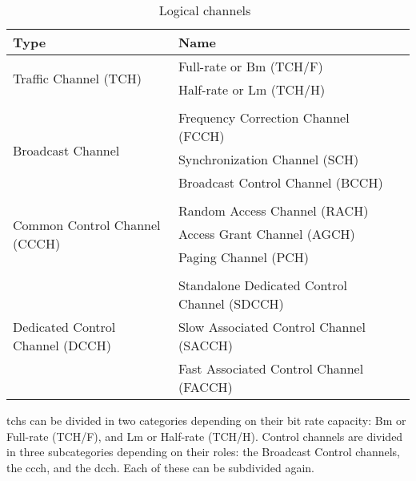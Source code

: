        \begin{table}[h]
          \centering
          \begin{tabular}{@{}lll@{}}
            \toprule
            Type          & Name                    \\
            \midrule

            \multirow{2}{*}{\parbox{0.30\textwidth}{\raggedright Traffic
            Channel (TCH)}} & Full-rate or Bm (TCH/F) \\
                          & Half-rate or Lm (TCH/H) \\

            \\

            \multirow{3}{*}{\parbox{0.30\textwidth}{\raggedright Broadcast
            Channel}} & Frequency Correction Channel (FCCH)\\
                          & Synchronization Channel (SCH)\\
                          & Broadcast Control Channel (BCCH)\\
            \\

            \multirow{3}{*}{\parbox{0.30\textwidth}{\raggedright Common
            Control Channel (CCCH)}} & Random Access Channel (RACH)\\
                          & Access Grant Channel (AGCH)\\
                          & Paging Channel (PCH)\\
            \\
             \multirow{3}{*}{\parbox{0.30\textwidth}{\raggedright
             Dedicated Control Channel (DCCH)}} & Standalone Dedicated Control Channel (SDCCH)\\
                          & Slow Associated Control Channel (SACCH)\\
                          & Fast Associated Control Channel (FACCH)\\
            \bottomrule
          \end{tabular}
          \caption{Logical channels~\cite{3gpp_ts_2015-3}}
          \label{tab:logical_channels}
        \end{table}

      \glspl{tch} can be divided in two categories depending on their
      bit rate capacity: Bm or Full-rate (TCH/F), and Lm or Half-rate
      (TCH/H). Control channels are divided in three subcategories
      depending on their roles: the Broadcast Control channels, the
      \gls{ccch}, and the \gls{dcch}. Each of these can be subdivided
      again.

